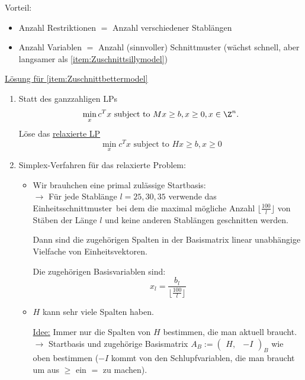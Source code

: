\begin{beispiel}[Zuschnittsoptimierung]
\begin{enumerate}[label={Variante \arabic*.}]
		Vorteil:
		\begin{itemize}
			\item Anzahl Restriktionen $=$ Anzahl verschiedener Stablängen
      \item Anzahl Variablen $=$ Anzahl (sinnvoller) Schnittmuster (wächst schnell, aber langsamer als \ref{item:Zuschnittsillymodel})
		\end{itemize}

 \end{enumerate}
 \underline{Lösung für \ref{item:Zuschnittbettermodel}}
\begin{enumerate}
	\item Statt des ganzzahligen LPs
		\begin{equation*}
			\min_{x} c^{T} x \text{ subject to } Mx \geq b, x \geq 0 , x \in \Z^{n}.
		\end{equation*}
		Löse das \underline{relaxierte LP}
	\begin{equation*}
		\min_{x} c^{T} x \text{ subject to } Hx \geq b, x \geq 0
	\end{equation*}
	\item Simplex-Verfahren für das relaxierte Problem:
		\begin{itemize}
			\item Wir brauhchen eine primal zulässige Startbasis:\\
			$\to$ Für jede Stablänge $l = 25,30,35$ verwende das \glqq Einheitsschnittmuster\grqq\ bei dem die maximal mögliche Anzahl $\lfloor\frac{100}{l}\rfloor$ von Stäben der Länge $l$ und keine anderen Stablängen geschnitten werden.


			Dann sind die zugehörigen Spalten in der Basismatrix linear unabhängige Vielfache von Einheitsvektoren.

		Die zugehörigen Basisvariablen sind:
		\begin{equation*}
			x_{l} = \frac{b_{l}}{\lfloor\frac{100}{l}\rfloor}
		\end{equation*}

		\item $H$ kann sehr viele Spalten haben.

			\underline{Idee:} Immer nur die Spalten von $H$ bestimmen, die man aktuell braucht.\\
			$\to$ Startbasis und zugehörige Basismatrix $A_{B} := \begin{pmatrix}
				H,&-I
			\end{pmatrix}_{B}
      $ wie oben bestimmen ($-I$ kommt von den Schlupfvariablen, die man braucht um aus $\geq$ ein $=$ zu machen).


\end{itemize}
\end{enumerate}
\end{beispiel}
